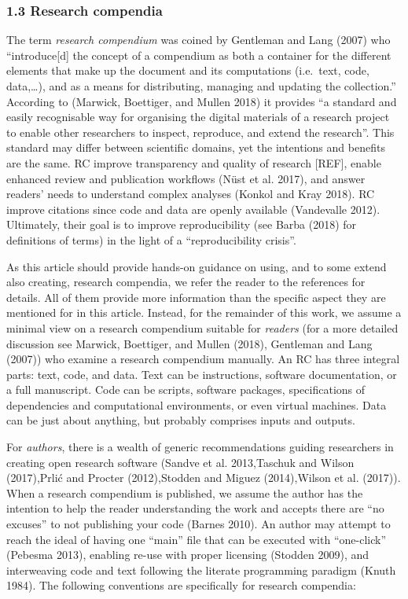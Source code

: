 \documentclass[fleqn,10pt]{wlpeerj} %
\begin{document}
\subsubsection*{1.3 Research compendia}\label{research-compendia}

The term \emph{research compendium} was coined by Gentleman and Lang
(2007) who ``introduce{[}d{]} the concept of a compendium as both a
container for the different elements that make up the document and its
computations (i.e.~text, code, data,\ldots{}), and as a means for
distributing, managing and updating the collection.'' According to
(Marwick, Boettiger, and Mullen 2018) it provides ``a standard and
easily recognisable way for organising the digital materials of a
research project to enable other researchers to inspect, reproduce, and
extend the research''. This standard may differ between scientific
domains, yet the intentions and benefits are the same. RC improve
transparency and quality of research {[}REF{]}, enable enhanced review
and publication workflows (Nüst et al. 2017), and answer readers' needs
to understand complex analyses (Konkol and Kray 2018). RC improve
citations since code and data are openly available (Vandevalle 2012).
Ultimately, their goal is to improve reproducibility (see Barba (2018)
for definitions of terms) in the light of a ``reproducibility crisis''.

As this article should provide hands-on guidance on using, and to some
extend also creating, research compendia, we refer the reader to the
references for details. All of them provide more information than the
specific aspect they are mentioned for in this article. Instead, for the
remainder of this work, we assume a minimal view on a research
compendium suitable for \emph{readers} (for a more detailed discussion
see Marwick, Boettiger, and Mullen (2018), Gentleman and Lang (2007))
who examine a research compendium manually. An RC has three integral
parts: text, code, and data. Text can be instructions, software
documentation, or a full manuscript. Code can be scripts, software
packages, specifications of dependencies and computational environments,
or even virtual machines. Data can be just about anything, but probably
comprises inputs and outputs.

For \emph{authors}, there is a wealth of generic recommendations guiding
researchers in creating open research software (Sandve et al.
2013,Taschuk and Wilson (2017),Prlić and Procter (2012),Stodden and
Miguez (2014),Wilson et al. (2017)). When a research compendium is
published, we assume the author has the intention to help the reader
understanding the work and accepts there are ``no excuses'' to not
publishing your code (Barnes 2010). An author may attempt to reach the
ideal of having one ``main'' file that can be executed with
``one-click'' (Pebesma 2013), enabling re-use with proper licensing
(Stodden 2009), and interweaving code and text following the literate
programming paradigm (Knuth 1984). The following conventions are
specifically for research compendia:
\end{document}
